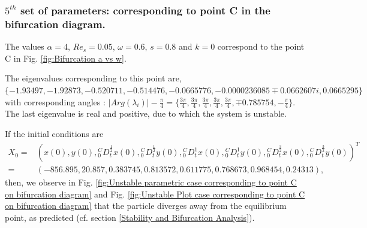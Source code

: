 \documentclass[pdflatex,sn-mathphys]{sn-jnl}%
\theoremstyle{thmstyleone}%
\theoremstyle{thmstyletwo}%
\theoremstyle{thmstylethree}%
\begin{document}
\subsubsection{$5^{th}$ set of parameters: corresponding to point C in the bifurcation diagram.}\label{$5^{th}$ set}

The values $\alpha = 4$, $Re_{s}=0.05$, $\omega=0.6$,  $s=0.8$ and $k=0$ correspond to the point C in Fig. \ref{fig:Bifurcation a vs w}.

The eigenvalues corresponding to this point are, $\{-1.93497,-1.92873,-0.520711,-0.514476, -0.0665776,-0.0000236085 \mp0.0662607 i,0.0665295\}$
with corresponding angles : $\vert Arg(\lambda_{i})\vert-\frac{\pi}{4} =\{\frac{3 \pi }{4},\frac{3 \pi }{4},\frac{3 \pi }{4},\frac{3 \pi }{4},\frac{3 \pi }{4},\mp 0.785754,-\frac{\pi }{4}\}$. The last eigenvalue is real and positive, due to which the system is unstable.

If the initial conditions are \begin{align*}
X_{0}=&
\left(
x(0) ,
y(0) ,
{ }_{0}^{C}D_{t}^{\frac{1}{2}}x(0) ,
{ }_{0}^{C}D_{t}^{\frac{1}{2}}y(0) ,
{ }_{0}^{C}D_{t}^{1} x(0) ,
{ }_{0}^{C}D_{t}^{1}y(0) ,
{ }_{0}^{C}D_{t}^{\frac{3}{2}}x(0) ,
{ }_{0}^{C}D_{t}^{\frac{3}{2}}y(0)
\right)^T \\ =& \left(
 -856.895,
 20.857,
 0.383745,
 0.813572,
 0.611775,
 0.768673,
 0.968454,
 0.24313 
\right),
\end{align*}
 then, we observe in Fig. \ref{fig:Unstable parametric case corresponding to point C on bifurcation diagram} and Fig. \ref{fig:Unstable Plot case corresponding to point C on bifurcation diagram}  that the particle diverges away from the equilibrium point, as predicted (cf. section \ref{Stability and Bifurcation Analysis}).
\end{document}
